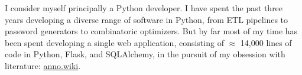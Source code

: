 \documentclass[9pt]{developercv} %
\begin{document}



\begin{minipage}[t]{0.4\textwidth} %
	\vspace{-\baselineskip} %

    I consider myself principally a Python developer. I have spent the past
    three years developing a diverse range of software in Python, from ETL
    pipelines to password generators to combinatoric optimizers. But by far most
    of my time has been spent developing a single web application, consisting of
    $\approx$ 14,000 lines of code in Python, Flask, and SQLAlchemy, in the
    pursuit of my obsession with literature:
    {\href{https://github.com/malan88/icc}{anno.wiki}}.
\end{minipage}
\hfill %
\begin{minipage}[t]{0.5\textwidth} %
	\vspace{-\baselineskip} %
	\begin{barchart}{5.5}
	\end{barchart}
\end{minipage}

\begin{center}
\end{center}
\end{document}
